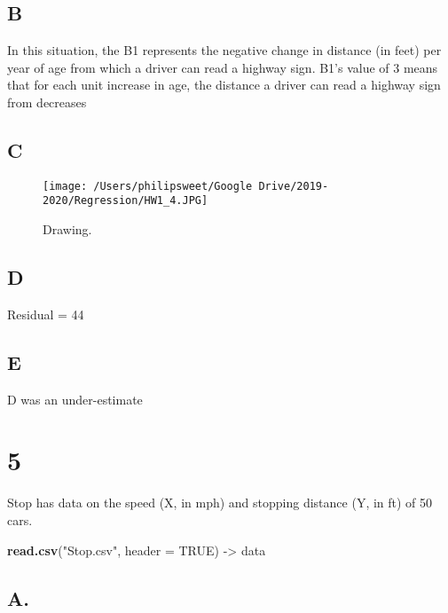 \documentclass[]{article}
\newenvironment{Shaded}{\begin{snugshade}}{\end{snugshade}}
\newcommand{\DataTypeTok}[1]{\textcolor[rgb]{0.13,0.29,0.53}{#1}}
\newcommand{\KeywordTok}[1]{\textcolor[rgb]{0.13,0.29,0.53}{\textbf{#1}}}
\newcommand{\NormalTok}[1]{#1}
\newcommand{\OtherTok}[1]{\textcolor[rgb]{0.56,0.35,0.01}{#1}}
\newcommand{\StringTok}[1]{\textcolor[rgb]{0.31,0.60,0.02}{#1}}
\begin{document}
\hypertarget{b}{%
\subsection{B}\label{b}}

In this situation, the B1 represents the negative change in distance (in
feet) per year of age from which a driver can read a highway sign. B1's
value of 3 means that for each unit increase in age, the distance a
driver can read a highway sign from decreases

\hypertarget{c}{%
\subsection{C}\label{c}}

\begin{figure}
\centering
\texttt{[image: /Users/philipsweet/Google Drive/2019-2020/Regression/HW1\_4.JPG]}
\caption{Drawing.}
\end{figure}

\hypertarget{d}{%
\subsection{D}\label{d}}

Residual = 44

\hypertarget{e}{%
\subsection{E}\label{e}}

D was an under-estimate

\hypertarget{section-4}{%
\section{\texorpdfstring{\textbf{5}}{5}}\label{section-4}}

Stop has data on the speed (X, in mph) and stopping distance (Y, in ft)
of 50 cars.

\begin{Shaded}
\begin{Highlighting}[]
\KeywordTok{read.csv}\NormalTok{(}\StringTok{"Stop.csv"}\NormalTok{, }\DataTypeTok{header =} \OtherTok{TRUE}\NormalTok{) ->}\StringTok{ }\NormalTok{data}
\end{Highlighting}
\end{Shaded}

\hypertarget{a.}{%
\subsection{A.}\label{a.}}
\end{document}
